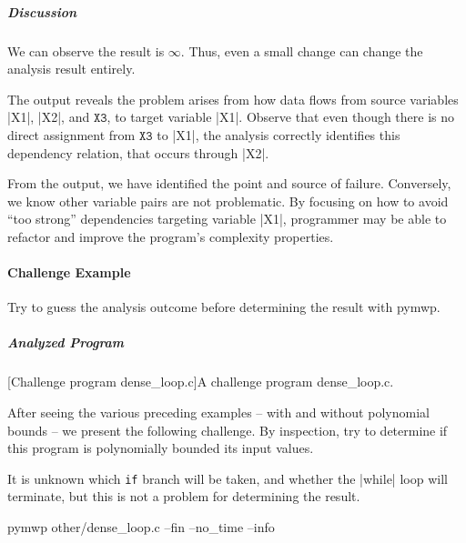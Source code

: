 \subparagraph*{Discussion}

We can observe the result is \(\infty\).
Thus, even a small change can change the analysis result entirely.

The output reveals the problem arises from how data flows from source variables \pr|X1|, \pr|X2|, and \(\texttt{X3}\), to target variable \pr|X1|.
Observe that even though there is no direct assignment from \(\texttt{X3}\) to \pr|X1|, the analysis correctly identifies this dependency relation, that occurs through \pr|X2|.

From the output, we have identified the point and source of failure.
Conversely, we know other variable pairs are not problematic.
By focusing on how to avoid \enquote{too strong} dependencies targeting variable \pr|X1|, programmer may be able to refactor and improve the program's complexity properties.

\paragraph{Challenge Example}\label{challenge-example}
Try to guess the analysis outcome before determining the result with pymwp.

\subparagraph*{Analyzed Program}

\begin{center}
\begin{minipage}{\textwidth}
\captionsetup{type=lstlisting}
[Challenge program dense\_loop.c]{A challenge program dense\_loop.c.}
\label{lst:challange}
\end{minipage}
\end{center}

After seeing the various preceding examples -- with and without polynomial bounds -- we present the following challenge.
By inspection, try to determine if this program is polynomially bounded \wrt its input values.

It is unknown which \texttt{if} branch will be taken, and whether the \pr|while| loop will terminate, but this is not a problem for determining the result.

\begin{center}
\begin{minipage}{\textwidth}
\begin{cmdlisting}[label={lst:ex5-run-cmd}]
pymwp other/dense_loop.c --fin --no_time --info
\end{cmdlisting}
\end{minipage}
\end{center}

